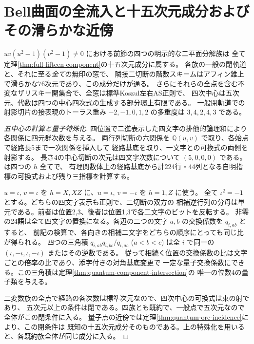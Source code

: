 \section{Bell曲面の全流入と十五次元成分およびその滑らかな近傍}
\label{sec:split-surface-component}
\begin{theorem}\label{thm:split-surface-component}
$u v(u^2-1)(v^2-1)\ne0$ における前節の四つの明示的な二平面分解族は
全て定理\ref{thm:full-fifteen-component}の十五次元成分に属する。
各族の一般の閉軌道と、それに至る\emph{全て}の無印の窓で、
隣接二切断の階数スキームはアフィン錐上で滑らかな76次元であり、この成分だけが通る。
さらにそれらの全点を含む不変なザリスキー開集合で、全窓は標準Koszul左右AS正則で、
四次中心は五次元、代数は四つの中心四次式の生成する部分環上有限である。
一般閉軌道での射影切片の接表現のトーラス重み $-2,-1,0,1,2$ の多重度は $3,4,2,4,3$ である。
\end{theorem}
\begin{proof}[五中心の計算と量子特殊化]
四位置で二進表示した四文字の排他的論理和により各関係に四元群次数を与える。
両行列切断の六関係を $\mathbb Q(u,v)$ で取り、各始点で経路長5まで一次関係を挿入して
経路基底を取り、一文字との可換式の両側を射影する。
長さ4の中心切断の次元は四文字次数について $(5,0,0,0)$ である。
 は四つの $h$ 全てで、
有理関数体上の経路基底から計224行・44列となる自明指標の可換式および残り三指標を計算する。

$u=\iota$, $v=\iota$ を $h=X,XZ$ に、$u=\iota$, $v=-\iota$ を $h=1,Z$ に使う。
全て $\iota^2=-1$ とする。どちらの四文字表示も正則で、二切断の双方の
相補逆行列の分母は単元である。前者は位置2,3、後者は位置1,3で各二文字のビットを反転する。
非零の24語は全て四文字の置換になる。各辺の二つの文字 $a,b$ の交換係数を $q_{i,ab}$ とすると、
前記の検算で、各向きの相補二文字をどちらの順序にとっても同じ比が得られる。
四つの三角積 $q_{i,ab}q_{i,bc}/q_{i,ac}$ ($a<b<c$) は全 $i$ で同一の
$(\iota,-\iota,\iota,-\iota)$ またはその逆数である。
従って相続く位置の交換係数の比は文字ごとの倍率の比であり、添字付きの対角基底変更で
一定な量子交換係数にできる。この三角積は定理\ref{thm:quantum-component-intersection}の
唯一の位数4の量子類を与える。

二変数族の全点で経路の各次数は標準次元なので、四次中心の可換式は束の射であり、
五次元以上の条件は閉である。四族とも既約で、一般点で五次元なので全体がこの閉条件に入る。
量子点の近傍では定理\ref{thm:quantum-ore-incidence}により、この閉条件は
既知の十五次元成分そのものである。上の特殊化を用いると、各既約族全体が同じ成分に入る。
\end{proof}
